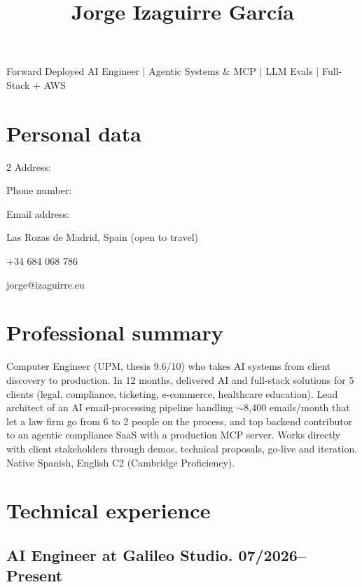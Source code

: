 \documentclass{article}
\title{Jorge Izaguirre Garc\'ia}
\author{}
\date{}
\begin{document}

\maketitle
\vspace{-1.6cm}

\begin{center}
Forward Deployed AI Engineer $|$ Agentic Systems \& MCP $|$ LLM Evals $|$ Full-Stack + AWS
\end{center}

\section*{Personal data}

\begin{multicols}{2}
\noindent Address:

\noindent Phone number:

\noindent Email address:

\columnbreak

\noindent Las Rozas de Madrid, Spain (open to travel)

\noindent +34 684 068 786

\noindent jorge@izaguirre.eu
\end{multicols}

\section*{Professional summary}

Computer Engineer (UPM, thesis 9.6/10) who takes AI systems from client discovery to production. In 12 months, delivered AI and full-stack solutions for 5 clients (legal, compliance, ticketing, e-commerce, healthcare education). Lead architect of an AI email-processing pipeline handling $\sim$8,400 emails/month that let a law firm go from 6 to 2 people on the process, and top backend contributor to an agentic compliance SaaS with a production MCP server. Works directly with client stakeholders through demos, technical proposals, go-live and iteration. Native Spanish, English C2 (Cambridge Proficiency).

\section*{Technical experience}

\subsection*{\hspace{0.25cm} AI Engineer at Galileo Studio. 07/2026--Present }
\end{document}
